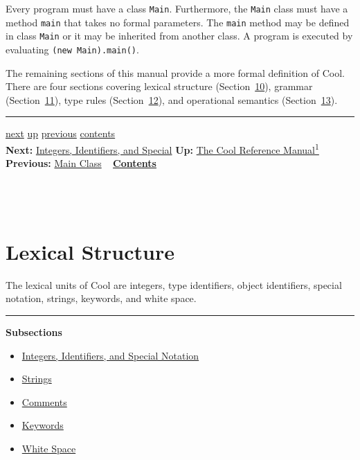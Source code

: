 \documentclass[]{article}
\begin{document}
Every program must have a class \texttt{Main}. Furthermore, the
\texttt{Main} class must have a method \texttt{main} that takes no
formal parameters. The \texttt{main} method may be defined in class
\texttt{Main} or it may be inherited from another class. A program is
executed by evaluating \texttt{(new Main).main()}.

The remaining sections of this manual provide a more formal definition
of Cool. There are four sections covering lexical structure
(Section~\href{node33.html\#lex-struct}{10}), grammar
(Section~\href{node39.html\#sec-gram}{11}), type rules
(Section~\href{node41.html\#sec-typrules}{12}), and operational
semantics (Section~\href{node44.html\#sec-opsem}{13}).

\begin{center}\rule{3in}{0.4pt}\end{center}

\href{node34.html}{next} \href{cool-manual.html}{up}
\href{node32.html}{previous} \href{node1.html}{contents} \\
\textbf{Next:} \href{node34.html}{Integers, Identifiers, and Special}
\textbf{Up:} \href{cool-manual.html}{The Cool Reference
Manual\textsuperscript{1}} \textbf{Previous:} \href{node32.html}{Main
Class} ~ \textbf{\href{node1.html}{Contents}} \\ \\

\section{\\ Lexical Structure}

The lexical units of Cool are integers, type identifiers, object
identifiers, special notation, strings, keywords, and white space.

\begin{center}\rule{3in}{0.4pt}\end{center}

\textbf{Subsections}

\begin{itemize}
\itemsep1pt\parskip0pt
\item
  \href{node34.html}{Integers, Identifiers, and Special Notation}
\item
  \href{node35.html}{Strings}
\item
  \href{node36.html}{Comments}
\item
  \href{node37.html}{Keywords}
\item
  \href{node38.html}{White Space}
\end{itemize}
\end{document}
